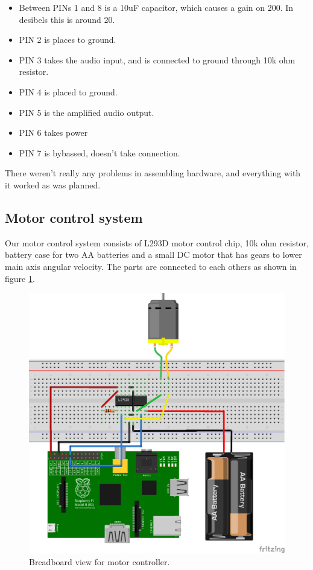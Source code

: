 \documentclass[english,11pt,twoside,a4paper]{article}
\begin{document}
\begin{itemize}
  \item Between PINs 1 and 8 is a 10uF capacitor, which causes a gain on 200. In desibels this is around 20.
  \item PIN 2 is places to ground.
  \item PIN 3 takes the audio input, and is connected to ground through 10k ohm resistor.
  \item PIN 4 is placed to ground.
  \item PIN 5 is the amplified audio output.
  \item PIN 6 takes power
  \item PIN 7 is bybassed, doesn't take connection.
\end{itemize}

There weren't really any problems in assembling hardware, and everything with it worked as was planned.

\subsection{Motor control system}

Our motor control system consists of L293D motor control chip, 10k ohm resistor, battery case for two AA batteries and a small DC motor that has gears to lower main axis angular velocity. The parts are connected to each others as shown in figure \ref{l293d_bb}.

\begin{figure}
  \begin{center}
    \includegraphics[scale=0.75]{motor_controllers_l293d_impl_bb.png}
    \caption{Breadboard view for motor controller.}
  \end{center}
  \label{l293d_bb}
\end{figure}
\end{document}
